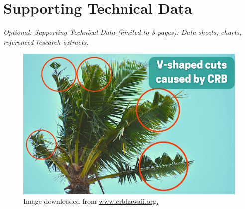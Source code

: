 \documentclass[11pt,english,letterpaper]{scrartcl}
\begin{document}
%
%
%
%
%
%
%	
%
%	
%
%	
%
%	
%

\clearpage
\section{Supporting Technical Data}

\textit{Optional: Supporting Technical Data (limited to 3 pages): Data sheets, charts, referenced research extracts.} \\

\begin{figure}[H]
	\centering
	\includegraphics[width=0.7\linewidth]{images/vcuts}
	\caption{Image downloaded from \url{www.crbhawaii.org.}}
	\label{fig:vcuts}
\end{figure}
\end{document}
